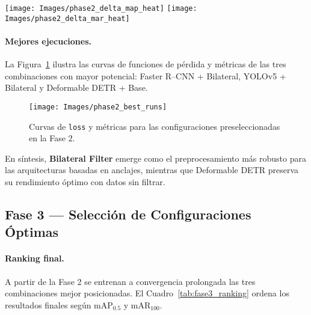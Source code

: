 \begin{figure*}[htpb]
  \centering
  \texttt{[image: Images/phase2\_delta\_map\_heat]}\hfill
  \texttt{[image: Images/phase2\_delta\_mar\_heat]}
  \caption[Diferencia relativa en mAP y mAR]{Matrices de \(\Delta\) respecto a la condición \textit{Base}.
           Izquierda: mAP\(_{0.5}\);\; derecha: mAR\(_{100}\).
           Un valor positivo (verde) indica mejora; negativo (rojo), degradación.}
  \label{fig:fase2_deltas}
\end{figure*}


\paragraph{Mejores ejecuciones.}
La Figura~\ref{fig:fase2_bestruns} ilustra las curvas de funciones de pérdida y métricas de las tres combinaciones con mayor potencial: Faster R–CNN + Bilateral, YOLOv5 + Bilateral y Deformable DETR + Base.

\begin{figure}[htpb]
  \centering
  \texttt{[image: Images/phase2\_best\_runs]}
  \caption[Evolución de las mejores configuraciones]{Curvas de \texttt{loss} y métricas para las configuraciones preseleccionadas en la Fase 2.}
  \label{fig:fase2_bestruns}
\end{figure}

\vspace{0.5em}
En síntesis, \textbf{Bilateral Filter} emerge como el preprocesamiento más robusto para las arquitecturas basadas en anclajes, mientras que Deformable DETR preserva su rendimiento óptimo con datos sin filtrar.

\subsection{Fase 3 — Selección de Configuraciones Óptimas}
\label{ssec:fase3}

\paragraph{Ranking final.}
A partir de la Fase 2 se entrenan a convergencia prolongada las tres combinaciones mejor posicionadas.
El Cuadro~\ref{tab:fase3_ranking} ordena los resultados finales según mAP\(_{0.5}\) y mAR\(_{100}\).

